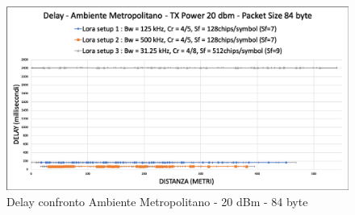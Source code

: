 \documentclass[12pt,a4paper,openright,twoside]{report}
\begin{document}
\begin{figure}[h]                      
\begin{center} 
\includegraphics[width=\textwidth]{DELAY_confronto_AM_20dBm_84byte.png}
\caption[Delay confronto Ambiente Metropolitano - 20 dBm - 84 byte]{Delay confronto Ambiente Metropolitano - 20 dBm - 84 byte}\label{fig:prima}
\end{center}
\end{figure}





%
\end{document}
